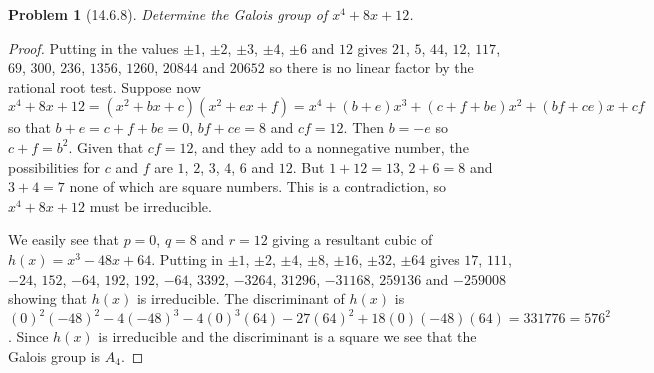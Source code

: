 \documentclass{article}
\newtheorem{problem}{Problem}
\begin{document}
\begin{problem}[14.6.8]
Determine the Galois group of $x^4 + 8x + 12$.
\end{problem}
\begin{proof}
Putting in the values $\pm 1$, $\pm 2$, $\pm 3$, $\pm 4$, $\pm 6$ and $12$ gives $21$, $5$, $44$, $12$, $117$, $69$, $300$, $236$, $1356$, $1260$, $20844$ and $20652$ so there is no linear factor by the rational root test. Suppose now $x^4 + 8x + 12 = (x^2 + bx + c)(x^2 + ex + f) = x^4 + (b+e)x^3 + (c + f + be)x^2 + (bf+ce)x + cf$ so that $b + e = c + f + be = 0$, $bf + ce = 8$ and $cf = 12$. Then $b = -e$ so $c + f = b^2$. Given that $cf = 12$, and they add to a nonnegative number, the possibilities for $c$ and $f$ are $1$, $2$, $3$, $4$, $6$ and $12$. But $1 + 12 = 13$, $2 + 6 = 8$ and $3 + 4 = 7$ none of which are square numbers. This is a contradiction, so $x^4 + 8x + 12$ must be irreducible.

We easily see that $p = 0$, $q = 8$ and $r = 12$ giving a resultant cubic of $h(x) = x^3 - 48x + 64$. Putting in $\pm 1$, $\pm 2$, $\pm 4$, $\pm 8$, $\pm 16$, $\pm 32$, $\pm 64$ gives $17$, $111$, $-24$, $152$, $-64$, $192$, $192$, $-64$, $3392$, $-3264$, $31296$, $-31168$, $259136$ and $-259008$ showing that $h(x)$ is irreducible. The discriminant of $h(x)$ is $(0)^2(-48)^2 - 4(-48)^3 - 4(0)^3(64) - 27(64)^2 + 18(0)(-48)(64) = 331776 = 576^2$. Since $h(x)$ is irreducible and the discriminant is a square we see that the Galois group is $A_4$.
\end{proof}
\end{document}
